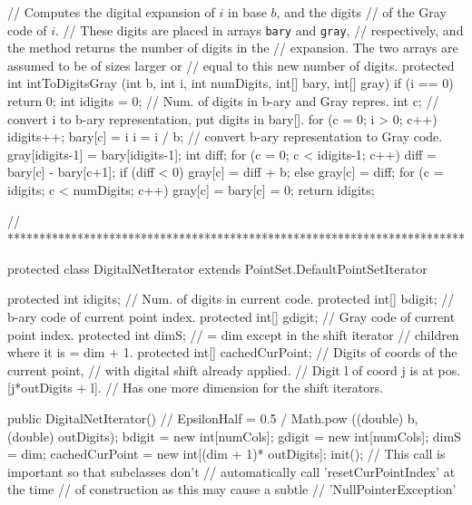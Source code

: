 \begin{code}\begin{hide}

      // Computes the digital expansion of $i$ in base $b$, and the digits
      // of the Gray code of $i$.
      // These digits are placed in arrays \texttt{bary} and \texttt{gray},
      // respectively, and the method returns the number of digits in the
      // expansion.  The two arrays are assumed to be of sizes larger or
      // equal to this new number of digits.
      protected int intToDigitsGray (int b, int i, int numDigits,
                                            int[] bary, int[] gray) {
         if (i == 0)
            return 0;
         int idigits = 0; // Num. of digits in b-ary and Gray repres.
         int c;
         // convert i to b-ary representation, put digits in bary[].
         for (c = 0; i > 0; c++) {
            idigits++;
            bary[c] = i %
            i = i / b;
         }
         // convert b-ary representation to Gray code.
         gray[idigits-1] = bary[idigits-1];
         int diff;
         for (c = 0;  c < idigits-1; c++) {
            diff = bary[c] - bary[c+1];
            if (diff < 0)
               gray[c] = diff + b;
            else
               gray[c] = diff;
         }
         for (c = idigits; c < numDigits; c++) gray[c] = bary[c] = 0;
         return idigits;
      }


// ************************************************************************

   protected class DigitalNetIterator extends
          PointSet.DefaultPointSetIterator {

      protected int idigits;        // Num. of digits in current code.
      protected int[] bdigit;       // b-ary code of current point index.
      protected int[] gdigit;       // Gray code of current point index.
      protected int dimS;           // = dim except in the shift iterator
                                    // children where it is = dim + 1.
      protected int[] cachedCurPoint; // Digits of coords of the current point,
                           // with digital shift already applied.
                           // Digit l of coord j is at pos. [j*outDigits + l].
                           // Has one more dimension for the shift iterators.

      public DigitalNetIterator() {
 //        EpsilonHalf = 0.5 / Math.pow ((double) b, (double) outDigits);
         bdigit = new int[numCols];
         gdigit = new int[numCols];
         dimS = dim;
         cachedCurPoint = new int[(dim + 1)* outDigits];
         init();  // This call is important so that subclasses don't
                  // automatically call 'resetCurPointIndex' at the time
                  // of construction as this may cause a subtle
                  // 'NullPointerException'
      }

}
\end{hide}
\end{code}
